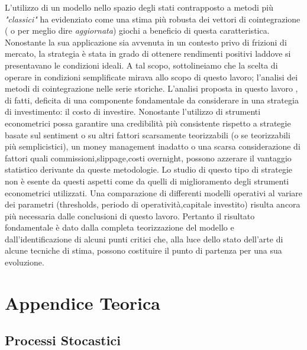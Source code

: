 \documentclass[]{article}
\begin{document}
L'utilizzo di un modello nello spazio degli stati contrapposto a metodi più \textit{"classici"} ha evidenziato come  una stima più robusta dei vettori di cointegrazione ( o per meglio dire \textit{aggiornata}) giochi a beneficio di questa caratteristica.
Nonostante la sua applicazione sia avvenuta in un contesto privo di frizioni di mercato, la strategia è stata in grado di ottenere rendimenti positivi laddove si presentavano le condizioni ideali.
A tal scopo, sottolineiamo che la scelta di operare in condizioni semplificate mirava allo scopo di questo lavoro; l'analisi dei metodi di cointegrazione nelle serie storiche.
L'analisi proposta in questo lavoro , di fatti, deficita di una componente fondamentale da considerare in una strategia di investimento: il costo di investire.
Nonostante l’utilizzo di strumenti econometrici possa garantire una credibilità più consistente rispetto a strategie basate sul sentiment o su altri fattori scarsamente teorizzabili (o se teorizzabili più semplicistici), un money management inadatto o una scarsa considerazione di fattori quali commissioni,slippage,costi overnight, possono azzerare il vantaggio statistico derivante da queste metodologie.
Lo studio di questo tipo di strategie non è esente da questi aspetti come da quelli di miglioramento degli strumenti econometrici utilizzati. Una comparazione di differenti modelli operativi al variare dei parametri (thresholds, periodo di operatività,capitale investito) risulta ancora più necessaria dalle conclusioni di questo lavoro.
Pertanto il risultato fondamentale è  dato dalla completa teorizzazione del modello e dall’identificazione di alcuni punti critici che, alla luce dello stato dell’arte di alcune tecniche di stima, possono costituire il punto di partenza per una sua evoluzione.




\break

\appendix
\section*{Appendice Teorica}
\renewcommand{\thesubsection}{\Alph{subsection}}

\subsection{Processi Stocastici}
\end{document}
